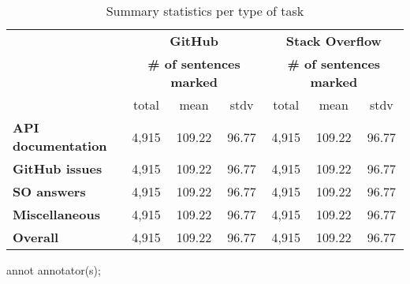 \begin{table}[H]
\centering    
\caption{Summary statistics per type of task}
\label{tbl:corpus-annotation-summary-by-task}
\begin{scriptsize}
\begin{threeparttable}
\begin{tabular}{lcccccc}



& \multicolumn{3}{c}{\textbf{GitHub}} & \multicolumn{3}{c}{\textbf{Stack Overflow}} \\

& \multicolumn{3}{c}{\textbf{\# of sentences marked}} 
& \multicolumn{3}{c}{\textbf{\# of sentences marked}}
\\ \cmidrule(l){2-4}  \cmidrule(l){5-7} 

& total & mean & stdv 
%
& total & mean & stdv
\\

\hline

\textbf{API documentation} 
& 4,915 & 109.22 & 96.77 %
& 4,915 & 109.22 & 96.77 %
\\
\textbf{GitHub issues} 
& 4,915 & 109.22 & 96.77 %
& 4,915 & 109.22 & 96.77 %
\\
\textbf{SO answers} 
& 4,915 & 109.22 & 96.77 %
& 4,915 & 109.22 & 96.77 %
\\
\textbf{Miscellaneous} 
& 4,915 & 109.22 & 96.77 %
& 4,915 & 109.22 & 96.77 %
\\

\hline
\textbf{Overall} 
& 4,915 & 109.22 & 96.77 %
& 4,915 & 109.22 & 96.77 %
\\
\hline

\end{tabular}
\begin{tablenotes}
    \item[annot] annotator(s);
\end{tablenotes}
\end{threeparttable}
\end{scriptsize}
\end{table}

